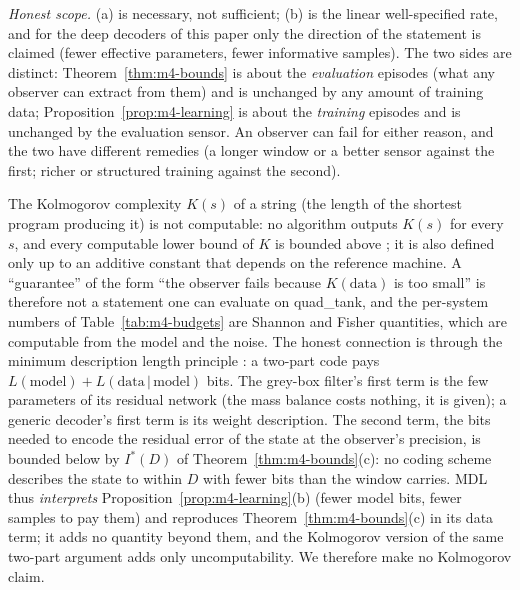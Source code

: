 \noindent\emph{Honest scope.} (a) is necessary, not sufficient; (b) is the linear well-specified rate, and for the
deep decoders of this paper only the direction of the statement is claimed (fewer effective parameters, fewer
informative samples). The two sides are distinct: Theorem~\ref{thm:m4-bounds} is about the \emph{evaluation}
episodes (what any observer can extract from them) and is unchanged by any amount of training data;
Proposition~\ref{prop:m4-learning} is about the \emph{training} episodes and is unchanged by the evaluation
sensor. An observer can fail for either reason, and the two have different remedies (a longer window or a better
sensor against the first; richer or structured training against the second).

\begin{remark}\label{rem:m4-kolmogorov}
The Kolmogorov complexity $K(s)$ of a string (the length of the shortest program producing it) is not computable:
no algorithm outputs $K(s)$ for every $s$, and every computable lower bound of $K$ is bounded above
\citep[Thm.~2.3.2 and its corollaries]{li2008kolmogorov}; it is also defined only up to an additive constant that
depends on the reference machine. A ``guarantee'' of the form ``the observer fails because $K(\text{data})$ is too
small'' is therefore not a statement one can evaluate on quad\_tank, and the per-system numbers of
Table~\ref{tab:m4-budgets} are Shannon and Fisher quantities, which are computable from the model and the noise.
The honest connection is through the minimum description length principle \citep{rissanen1978modeling,grunwald2007mdl}:
a two-part code pays $L(\text{model})+L(\text{data}\,|\,\text{model})$ bits. The grey-box filter's first term is the
few parameters of its residual network (the mass balance costs nothing, it is given); a generic decoder's first
term is its weight description. The second term, the bits needed to encode the residual error of the state at the
observer's precision, is bounded below by $I^*(D)$ of Theorem~\ref{thm:m4-bounds}(c): no coding scheme describes
the state to within $D$ with fewer bits than the window carries. MDL thus \emph{interprets}
Proposition~\ref{prop:m4-learning}(b) (fewer model bits, fewer samples to pay them) and reproduces
Theorem~\ref{thm:m4-bounds}(c) in its data term; it adds no quantity beyond them, and the Kolmogorov version of
the same two-part argument \citep[Ch.~5]{li2008kolmogorov} adds only uncomputability. We therefore make no
Kolmogorov claim.
\end{remark}


